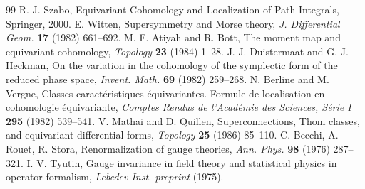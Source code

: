 \documentclass[10pt]{article}
\theoremstyle{definition}
\begin{document}
\begin{thebibliography}{99}
 R. J. Szabo, Equivariant Cohomology and Localization of Path Integrals, Springer, 2000.
 E. Witten, Supersymmetry and Morse theory, \textit{J. Differential Geom.} \textbf{17} (1982) 661--692.
 M. F. Atiyah and R. Bott, The moment map and equivariant cohomology, \textit{Topology} \textbf{23} (1984) 1--28.
 J. J. Duistermaat and G. J. Heckman, On the variation in the cohomology of the symplectic form of the reduced phase space, \textit{Invent. Math.} \textbf{69} (1982) 259--268.
 N. Berline and M. Vergne, Classes caractéristiques équivariantes. Formule de localisation en cohomologie équivariante, \textit{Comptes Rendus de l'Académie des Sciences, Série I} \textbf{295} (1982) 539--541.
 V. Mathai and D. Quillen, Superconnections, Thom classes, and equivariant differential forms, \textit{Topology} \textbf{25} (1986) 85--110.
 C. Becchi, A. Rouet, R. Stora, Renormalization of gauge theories, \textit{Ann. Phys.} \textbf{98} (1976) 287--321.
 I. V. Tyutin, Gauge invariance in field theory and statistical physics in operator formalism, \textit{Lebedev Inst. preprint} (1975).
\end{thebibliography}
\end{document}
